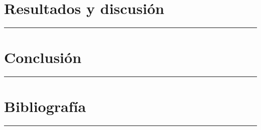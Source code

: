 \documentclass[a4paper,11pt]{article}
\begin{document}
\newpage
\section{Resultados y discusión}
{\color{tfgazul}\rule{\textwidth}{3pt}}


\newpage
\section{Conclusión}
{\color{tfgazul}\rule{\textwidth}{3pt}}


\newpage
\section{Bibliografía}
{\color{tfgazul}\rule{\textwidth}{3pt}}


\renewcommand{\refname}{} 



\sinmarcaagua
\end{document}
